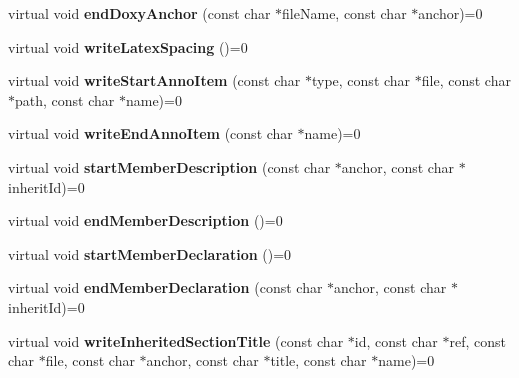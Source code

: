 \begin{DoxyCompactItemize}
\item 
\hypertarget{class_output_generator_adc285e0e8b5b5b5106516b4e4039b6c6}{virtual void {\bfseries end\-Doxy\-Anchor} (const char $\ast$file\-Name, const char $\ast$anchor)=0}\label{class_output_generator_adc285e0e8b5b5b5106516b4e4039b6c6}

\item 
\hypertarget{class_output_generator_a9fe591a329885a3a726fd0fb4d4064df}{virtual void {\bfseries write\-Latex\-Spacing} ()=0}\label{class_output_generator_a9fe591a329885a3a726fd0fb4d4064df}

\item 
\hypertarget{class_output_generator_a58f0d0455416383d6fd71c2935b8c02c}{virtual void {\bfseries write\-Start\-Anno\-Item} (const char $\ast$type, const char $\ast$file, const char $\ast$path, const char $\ast$name)=0}\label{class_output_generator_a58f0d0455416383d6fd71c2935b8c02c}

\item 
\hypertarget{class_output_generator_ab64eef8ab1186fc238963a6b8850bd7e}{virtual void {\bfseries write\-End\-Anno\-Item} (const char $\ast$name)=0}\label{class_output_generator_ab64eef8ab1186fc238963a6b8850bd7e}

\item 
\hypertarget{class_output_generator_ab719d2002c925662fc7ab30e571fedd5}{virtual void {\bfseries start\-Member\-Description} (const char $\ast$anchor, const char $\ast$inherit\-Id)=0}\label{class_output_generator_ab719d2002c925662fc7ab30e571fedd5}

\item 
\hypertarget{class_output_generator_a1aad53781817549fe9f7bf98da8eab9d}{virtual void {\bfseries end\-Member\-Description} ()=0}\label{class_output_generator_a1aad53781817549fe9f7bf98da8eab9d}

\item 
\hypertarget{class_output_generator_a56736a451172a8f55560324cce507b53}{virtual void {\bfseries start\-Member\-Declaration} ()=0}\label{class_output_generator_a56736a451172a8f55560324cce507b53}

\item 
\hypertarget{class_output_generator_aa6a0c6885e4378750a150a9195b9f5b3}{virtual void {\bfseries end\-Member\-Declaration} (const char $\ast$anchor, const char $\ast$inherit\-Id)=0}\label{class_output_generator_aa6a0c6885e4378750a150a9195b9f5b3}

\item 
\hypertarget{class_output_generator_ae248a25065376defbc168b3a1eeed3c9}{virtual void {\bfseries write\-Inherited\-Section\-Title} (const char $\ast$id, const char $\ast$ref, const char $\ast$file, const char $\ast$anchor, const char $\ast$title, const char $\ast$name)=0}\label{class_output_generator_ae248a25065376defbc168b3a1eeed3c9}


\end{DoxyCompactItemize}
